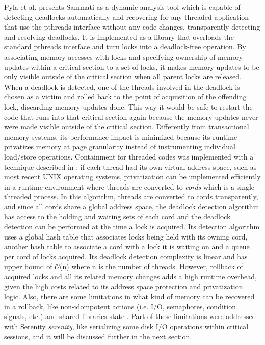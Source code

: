 Pyla et al. \cite{sammati} presents Sammati as a dynamic analysis tool which is capable of detecting deadlocks automatically and
recovering for any threaded application that use the pthreads interface without any code changes, transparently detecting and resolving deadlocks.
It is implemented as a library that overloads the standard pthreads interface and turn locks into a deadlock-free operation.
By associating memory accesses with locks and specifying ownership of memory updates within a critical section to a set of locks,
it makes memory updates to be only visible outside of the critical section when all parent locks are released.
When a deadlock is detected, one of the threads involved in the deadlock is
chosen as a victim and rolled back to the point of acquisition of the offending lock, discarding memory updates done.
This way it would be safe to restart the code that runs into that critical section again because the memory updates never
were made visible outside of the critical section. Differently from transactional memory systems,
its performance impact is minimized because its runtime privatizes memory at page granularity instead of instrumenting
individual load/store operations. Containment for threaded codes was implemented with a technique described in \cite{berger}:
if each thread had its own virtual address space, such as most recent UNIX operating systems,
privatization can be implemented efficiently in a runtime environment where threads are converted to \emph{cords} which is a single threaded process.
In this algorithm, threads are converted to cords transparently, and since all cords share a global address space, the deadlock detection algorithm
has access to the holding and waiting sets of each cord and the deadlock detection can be performed at the time a lock is acquired.
Its detection algorithm uses a global hash table that associates locks being held with its owning cord, another hash table to associate a cord with a lock it is waiting on and a
queue per cord of locks acquired. Its deadlock detection complexity is linear and has upper bound of $\mathcal{O}$(n) where n is the number of threads.
However, rollback of acquired locks and all its related memory changes adds a high runtime overhead, given the high costs related to its address space protection
and privatization logic. Also, there are some limitations in what kind of memory can be recovered in a rollback, like
non-idompotent actions (i.e. I/O, semaphores, condition signals, etc.) and shared libraries state \cite{pyla}.
Part of these limitations were addressed with Serenity \emph{serenity}, like serializing some disk I/O operations within critical sessions,
and it will be discussed further in the next section.

